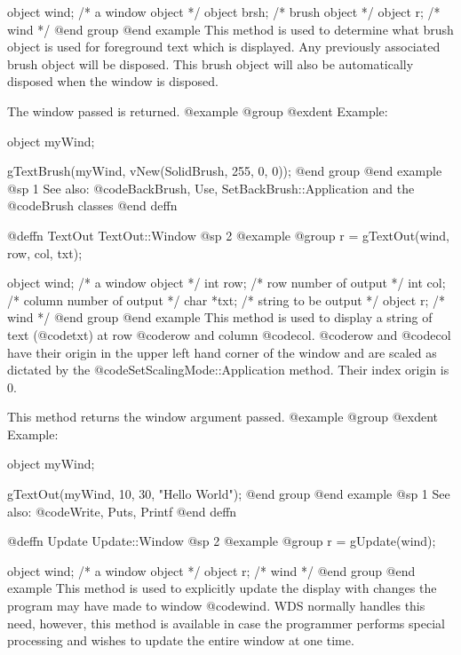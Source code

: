 object  wind;   /*  a window object   */
object  brsh;   /*  brush object      */
object  r;      /*  wind              */
@end group
@end example
This method is used to determine what brush object is used for foreground
text which is displayed.  Any previously associated brush object will
be disposed.  This brush object will also be automatically disposed when the
window is disposed.

The window passed is returned.
@example
@group
@exdent Example:

object  myWind;

gTextBrush(myWind, vNew(SolidBrush, 255, 0, 0));
@end group
@end example
@sp 1
See also:  @code{BackBrush, Use, SetBackBrush::Application}
        and the @code{Brush} classes
@end deffn










@deffn {TextOut} TextOut::Window
@sp 2
@example
@group
r = gTextOut(wind, row, col, txt);

object  wind;   /*  a window object          */
int     row;    /*  row number of output     */
int     col;    /*  column number of output  */
char    *txt;   /*  string to be output      */
object  r;      /*  wind                     */
@end group
@end example
This method is used to display a string of text (@code{txt}) at row
@code{row} and column @code{col}.  @code{row} and @code{col} have their
origin in the upper left hand corner of the window and are scaled as
dictated by the @code{SetScalingMode::Application} method.
Their index origin is 0.

This method returns the window argument passed.
@example
@group
@exdent Example:

object  myWind;

gTextOut(myWind, 10, 30, "Hello World");
@end group
@end example
@sp 1
See also:  @code{Write, Puts, Printf}
@end deffn









@deffn {Update} Update::Window
@sp 2
@example
@group
r = gUpdate(wind);

object  wind;   /*  a window object     */
object  r;      /*  wind                */
@end group
@end example
This method is used to explicitly update the display with changes the program
may have made to window @code{wind}.  WDS normally handles this need, however,
this method is available in case the programmer performs special processing
and wishes to update the entire window at one time.

